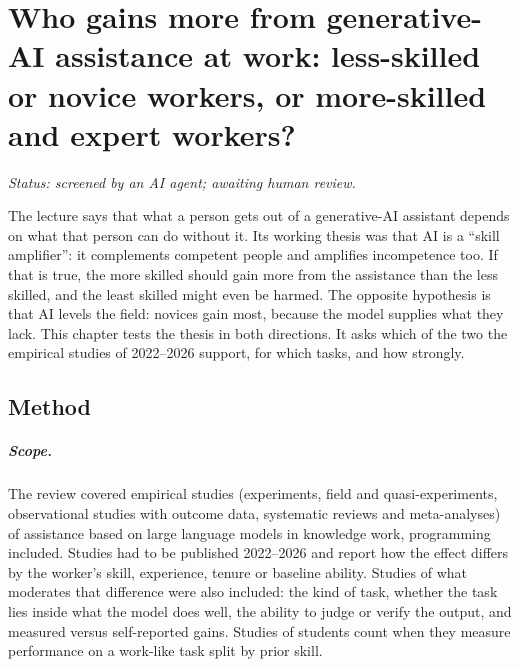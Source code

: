 
\chapter{Who gains more from generative-AI assistance at work: less-skilled or novice workers, or more-skilled and expert workers?}
\label{who-gains:chapter}

\emph{Status: screened by an AI agent; awaiting human review.}

The lecture says that what a person gets out of a generative-AI
assistant depends on what that person can do without it. Its working
thesis was that AI is a \enquote{skill amplifier}: it complements
competent people and amplifies incompetence too. If that is true, the
more skilled should gain more from the assistance than the less skilled,
and the least skilled might even be harmed. The opposite hypothesis is
that AI levels the field: novices gain most, because the model supplies
what they lack. This chapter tests the thesis in both directions. It
asks which of the two the empirical studies of 2022--2026 support, for
which tasks, and how strongly.

\section{Method}
\label{who-gains:method}

\paragraph{Scope.}
The review covered empirical studies (experiments, field and
quasi-experiments, observational studies with outcome data, systematic
reviews and meta-analyses) of assistance based on large language models
in knowledge work, programming included. Studies had to be published
2022--2026 and report how the effect differs by the worker's skill,
experience, tenure or baseline ability. Studies of what moderates that
difference were also included: the kind of task, whether the task lies
inside what the model does well, the ability to judge or verify the
output, and measured versus self-reported gains. Studies of students
count when they measure performance on a work-like task split by prior
skill.


